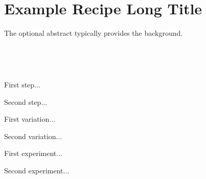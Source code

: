 \section[Example Recipe]{Example Recipe Long Title}

\begin{recipestats}[
	servings=no. of servings,
	preptime=preparation time,
	bakingtime=cooking time,
	source=source or inspiration,
]
\end{recipestats}


\begin{recipeabstract}
	The optional abstract typically provides the background.
\end{recipeabstract}

\begin{ingredientcolumns}
	\begin{ingredientblock}
		\\
	\end{ingredientblock}
	\begin{ingredientblock}
		\\
	\end{ingredientblock}
\end{ingredientcolumns}


\begin{preparation}
	\item First step...
	\item Second step...
\end{preparation}

\begin{variation}
	\item First variation...
	\item Second variation...
\end{variation}

\begin{experiments}
	\item First experiment...
	\item Second experiment...
\end{experiments}

\recipeend
